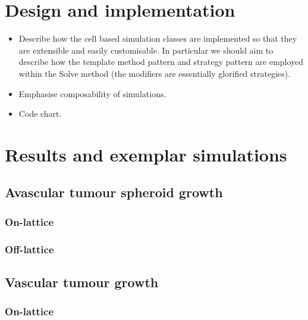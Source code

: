 \documentclass[superscriptaddress, a4paper]{article}
\begin{document}
\section{Design and implementation}
\label{sec:design and implementation}

\begin{itemize}
 \item Describe how the cell based simulation classes are implemented so that they are extensible and easily customisable. In particular we should aim to describe how the template method pattern and strategy pattern are employed within the Solve method (the modifiers are essentially glorified strategies).
 \item Emphasise composability of simulations. 
  \item Code chart.
\end{itemize}

\section{Results and exemplar simulations}
\label{sec:results}

\subsection{Avascular tumour spheroid growth}
\label{sec:avascular tumour spheroid growth}

\subsubsection{On-lattice}
\label{sec:on-lattice avascular tumour spheroid growth}



\subsubsection{Off-lattice}
\label{sec:off-lattice avascular tumour spheroid growth}


\subsection{Vascular tumour growth}
\label{sec:vascular tumour growth}

\subsubsection{On-lattice}
\label{sec:on-lattice vascular tumour growth}
\end{document}

